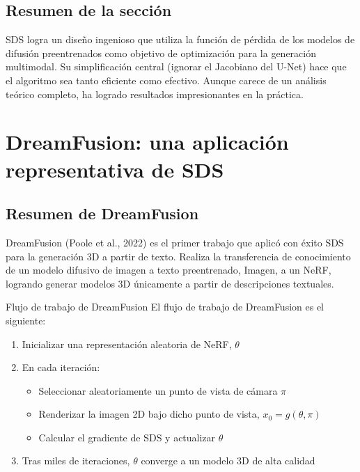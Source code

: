 \documentclass[a4paper]{article}
\begin{document}
\subsection{Resumen de la sección}

SDS logra un diseño ingenioso que utiliza la función de pérdida de los modelos de difusión preentrenados como objetivo de optimización para la generación multimodal. Su simplificación central (ignorar el Jacobiano del U-Net) hace que el algoritmo sea tanto eficiente como efectivo. Aunque carece de un análisis teórico completo, ha logrado resultados impresionantes en la práctica.

\newpage
\section{DreamFusion: una aplicación representativa de SDS}

\subsection{Resumen de DreamFusion}

DreamFusion (Poole et al., 2022) es el primer trabajo que aplicó con éxito SDS para la generación 3D a partir de texto. Realiza la transferencia de conocimiento de un modelo difusivo de imagen a texto preentrenado, Imagen, a un NeRF, logrando generar modelos 3D únicamente a partir de descripciones textuales.

\begin{importantbox}{Flujo de trabajo de DreamFusion}
El flujo de trabajo de DreamFusion es el siguiente:
\begin{enumerate}
    \item Inicializar una representación aleatoria de NeRF, $\theta$
    \item En cada iteración:
    \begin{itemize}
        \item Seleccionar aleatoriamente un punto de vista de cámara $\pi$
        \item Renderizar la imagen 2D bajo dicho punto de vista, $x_0 = g(\theta, \pi)$
        \item Calcular el gradiente de SDS y actualizar $\theta$
    \end{itemize}
    \item Tras miles de iteraciones, $\theta$ converge a un modelo 3D de alta calidad
\end{enumerate}
\end{importantbox}
\end{document}

